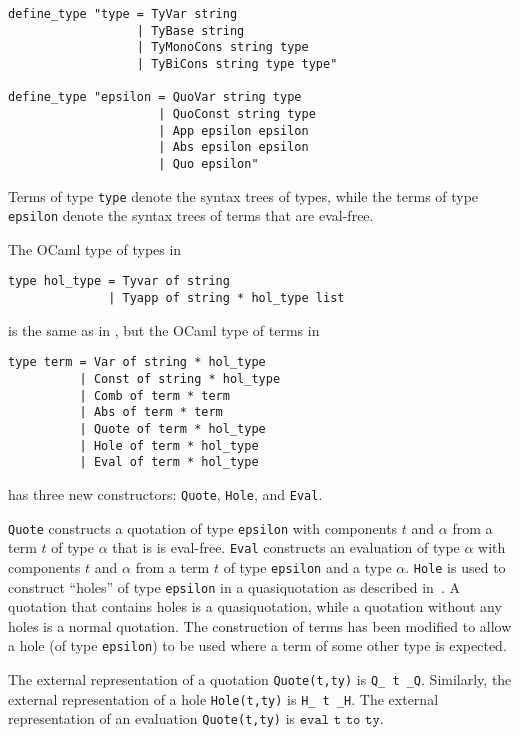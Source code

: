 \documentclass[fleqn]{llncs}
\begin{document}
\begin{lstlisting}
define_type "type = TyVar string
                  | TyBase string
                  | TyMonoCons string type
                  | TyBiCons string type type"

define_type "epsilon = QuoVar string type 
                     | QuoConst string type
                     | App epsilon epsilon
                     | Abs epsilon epsilon
                     | Quo epsilon"
\end{lstlisting}

\noindent
Terms of type \texttt{type} denote the syntax trees of {\HLQE} types,
while the terms of type \texttt{epsilon} denote the syntax trees of
{\HLQE} terms that are eval-free.

The OCaml type of {\HOL} types in {\HLQE}

\begin{lstlisting}
type hol_type = Tyvar of string
              | Tyapp of string * hol_type list
\end{lstlisting}

\noindent
is the same as in {\HL}, but the OCaml type of {\HOL} terms in {\HLQE}

\begin{lstlisting}
type term = Var of string * hol_type
          | Const of string * hol_type
          | Comb of term * term
          | Abs of term * term
          | Quote of term * hol_type
          | Hole of term * hol_type
          | Eval of term * hol_type
\end{lstlisting}

\noindent
has three new constructors: \texttt{Quote}, \texttt{Hole}, and
\texttt{Eval}.

\texttt{Quote} constructs a quotation of type \texttt{epsilon} with
components $t$ and $\alpha$ from a term $t$ of type $\alpha$ that is
is eval-free.  \texttt{Eval} constructs an evaluation of type $\alpha$
with components $t$ and $\alpha$ from a term $t$ of type
\texttt{epsilon} and a type $\alpha$.  \texttt{Hole} is used to
construct ``holes'' of type \texttt{epsilon} in a quasiquotation as
described in~\cite{Farmer18}.  A {\HLQE} quotation that contains
holes is a quasiquotation, while a quotation without any holes is a
normal quotation.  The construction of terms has been
modified to allow a hole (of type \texttt{epsilon}) to be used where a
term of some other type is expected.

The external representation of a quotation \texttt{Quote(t,ty)} is
\texttt{Q\_ t \_Q}.  Similarly, the external representation of a hole
\texttt{Hole(t,ty)} is \texttt{H\_ t \_H}.  The external
representation of an evaluation \texttt{Quote(t,ty)} is $\texttt{eval
  t to ty}.$
\end{document}
